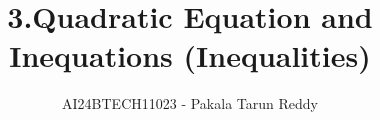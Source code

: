 \documentclass[journal,12pt,twocolumn]{IEEEtran}
\theoremstyle{remark}
\begin{document}

\vspace{3cm}

\title{3.Quadratic Equation and\\ Inequations (Inequalities)}
\author{AI24BTECH11023 - Pakala Tarun Reddy}
\\\\
\\\\
\end{document}
